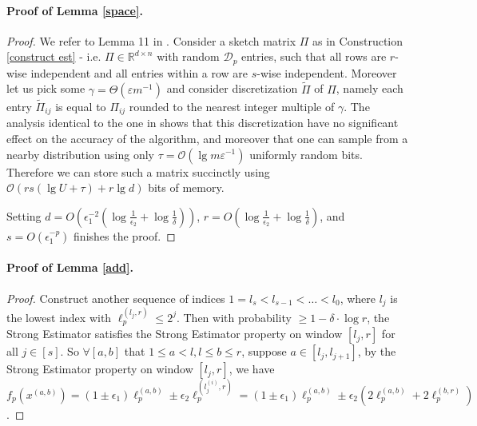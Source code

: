 \documentclass{article}
\newcommand{\est}{\textsf{Strong Estimator }}
\theoremstyle{plain}
\begin{document}
\paragraph{Proof of Lemma \ref{space}.}
\begin{proof}
    We refer to Lemma 11 in \cite{blasiok2017continuous}. Consider a sketch matrix $\Pi$ as in Construction \ref{construct est} - i.e. $\Pi \in \mathbb{R}^{d \times n}$ with random $\mathcal{D}_p$ entries, such that all rows are $r$-wise independent and all entries within a row are $s$-wise independent. Moreover let us pick some $\gamma=\Theta\left(\varepsilon m^{-1}\right)$ and consider discretization $\tilde{\Pi}$ of $\Pi$, namely each entry $\tilde{\Pi}_{i j}$ is equal to $\Pi_{i j}$ rounded to the nearest integer multiple of $\gamma$. The analysis identical to the one in \cite{kane2010exact} shows that this discretization have no significant effect on the accuracy of the algorithm, and moreover that one can sample from a nearby distribution using only $\tau=\mathcal{O}\left(\lg m \varepsilon^{-1}\right)$ uniformly random bits. Therefore we can store such a matrix succinctly using $\mathcal{O}(r s(\lg U+\tau)+r \lg d)$ bits of memory.

    Setting $d = O(\epsilon_1 ^ {-2}(\log \frac 1{\epsilon_2} + \log \frac 1{\delta}))$, $r = O(\log \frac 1{\epsilon_2} + \log \frac 1{\delta})$, and $s = O(\epsilon_1 ^ {-p})$ finishes the proof.
\end{proof}

\paragraph{Proof of Lemma \ref{add}.}
\begin{proof}
Construct another sequence of indices $1 = l_{s} < l_{s-1}  < \dots < l_0$, where $l_j$ is the lowest index with $\ell_p ^ {(l_j, r)} \le 2 ^ j$. Then with probability $\ge 1 - \delta \cdot \log r$,  the \est satisfies the \est property on window $[l_j, r]$ for all $j\in [s]$. So $\forall [a, b]$ that $1 \le a < l, l \le b \le r$, suppose $a \in [l_j, l_{j + 1}]$, by the \est property on window $[l_j, r]$, we have $f_p (x ^ {(a,b)}) = (1\pm \epsilon_1) \ell_p ^ {(a, b)} \pm \epsilon_2 \ell_p ^ {(l_j ^ {(i)},r)} = (1\pm \epsilon_1) \ell_p ^ {(a, b)} \pm \epsilon_2 (2\ell_p ^ {(a, b)} + 2\ell_p ^ {(b, r)})$.

\end{proof}
\end{document}
